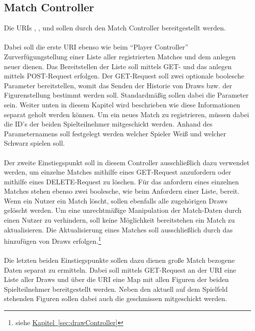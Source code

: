 \subsection{Match Controller}\label{sec:matchController}
Die \glspl{URI} , ,  und  sollen durch den Match Controller bereitgestellt werden.\\
\\
Dabei soll die erste \gls{URI} ebenso wie beim \enquote{Player Controller} Zurverfügungstellung einer Liste aller registrierten Matches und dem anlegen neuer dienen. Das Bereitstellen der Liste soll mittels GET- und das anlegen mittels POST-Request erfolgen. Der GET-Request soll zwei optionale boolesche Parameter bereitstellen, womit das Senden der Historie von Draws bzw. der Figurenstellung bestimmt werden soll. Standardmäßig sollen dabei die Parameter  sein. Weiter unten in diesem Kapitel wird beschrieben wie diese Informationen separat geholt werden können. Um ein neues Match zu registrieren, müssen dabei die ID's der beiden Spielteilnehmer mitgeschickt werden. Anhand des Parameternamens soll festgelegt werden welcher Spieler Weiß und welcher Schwarz spielen soll.\\
\\
Der zweite Einstiegspunkt soll in diesem Controller ausschließlich dazu verwendet werden, um einzelne Matches mithilfe eines GET-Request anzufordern oder mithilfe eines DELETE-Request zu löschen. Für das anfordern eines einzelnen Matches stehen ebenso zwei boolesche, wie beim Anfordern einer Liste, bereit. Wenn ein Nutzer ein Match löscht, sollen ebenfalls alle zugehörigen Draws gelöscht werden. Um eine unrechtmäßige Manipulation der Match-Daten durch einen Nutzer zu verhindern, soll keine Möglichkeit bereitstehen ein Match zu aktualisieren. Die Aktualisierung eines Matches soll ausschließlich durch das hinzufügen von Draws erfolgen.\footnote{siehe \hyperref[sec:drawController]{Kapitel~\ref{sec:drawController}}}\\
\\
Die letzten beiden Einstiegspunkte sollen dazu dienen große Match bezogene Daten separat zu ermitteln. Dabei soll mittels GET-Request an der \gls{URI}  eine Liste aller Draws und über die \gls{URI}  eine Map mit allen Figuren der beiden Spielteilnehmer bereitgestellt werden. Neben den aktuell auf dem Spielfeld stehenden Figuren sollen dabei auch die geschmissen mitgeschickt werden.\\
